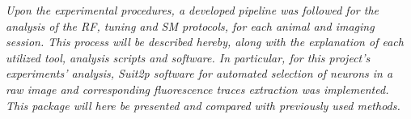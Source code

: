 
\label{cap:chapter}

\textit{Upon the experimental procedures, a developed pipeline was followed for the analysis of the RF, tuning and SM protocols, for each animal and imaging session. This process will be described hereby, along with the explanation of each utilized tool, analysis scripts and software. In particular, for this project's experiments' analysis, Suit2p software for automated selection of neurons in a raw image and corresponding fluorescence traces extraction was implemented. This package will here be presented and compared with previously used methods.}




\cleardoublepage